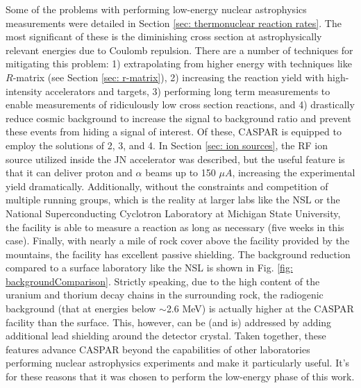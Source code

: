 Some of the problems with performing low-energy nuclear astrophysics measurements were detailed in Section \ref{sec: thermonuclear reaction rates}. The most significant of these is the diminishing cross section at astrophysically relevant energies due to Coulomb repulsion. There are a number of techniques for mitigating this problem: 1) extrapolating from higher energy with techniques like $R$-matrix (see Section \ref{sec: r-matrix}), 2) increasing the reaction yield with high-intensity accelerators and targets, 3) performing long term measurements to enable measurements of ridiculously low cross section reactions, and 4) drastically reduce cosmic background to increase the signal to background ratio and prevent these events from hiding a signal of interest. Of these, CASPAR is equipped to employ the solutions of 2, 3, and 4. In Section \ref{sec: ion sources}, the RF ion source utilized inside the JN accelerator was described, but the useful feature is that it can deliver proton and $\alpha$ beams up to 150 $\mu A$, increasing the experimental yield dramatically. Additionally, without the constraints and competition of multiple running groups, which is the reality at larger labs like the NSL or the National Superconducting Cyclotron Laboratory at Michigan State University, the facility is able to measure a reaction as long as necessary (five weeks in this case). Finally, with nearly a mile of rock cover above the facility provided by the mountains, the facility has excellent passive shielding. The background reduction compared to a surface laboratory like the NSL is shown in Fig. \ref{fig: backgroundComparison}. Strictly speaking, due to the high content of the uranium and thorium decay chains in the surrounding rock, the radiogenic background (that at energies below $\sim$2.6 MeV) is actually higher at the CASPAR facility than the surface. This, however, can be (and is) addressed by adding additional lead shielding around the detector crystal. Taken together, these features advance CASPAR beyond the capabilities of other laboratories performing nuclear astrophysics experiments and make it particularly useful. It's for these reasons that it was chosen to perform the low-energy phase of this work. 


